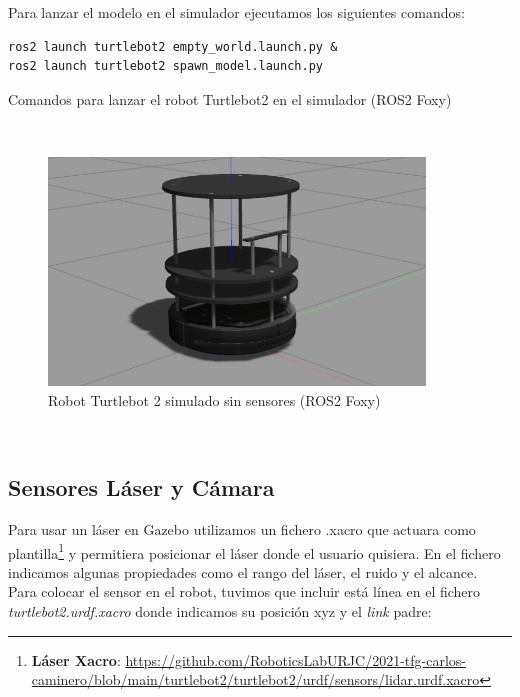 Para lanzar el modelo en el simulador ejecutamos los siguientes comandos:\\
\begin{code}[H]
\begin{lstlisting}
ros2 launch turtlebot2 empty_world.launch.py &
ros2 launch turtlebot2 spawn_model.launch.py
\end{lstlisting}
\caption{Comandos para lanzar el robot Turtlebot2 en el simulador (ROS2 Foxy)}
\label{codd:comandos_turtlebot2_simulador}
\end{code}\

\begin{figure} [H]
  \begin{center}
    \includegraphics[width=10cm]{imagenes/cap4/cuerpo_turtlebot2.png}
  \end{center}
  \caption[Robot Turtlebot 2 simulado sin sensores (ROS2 Foxy)]{Robot Turtlebot 2 simulado sin sensores (ROS2 Foxy)}
  \label{fig:turtlebot2_sin_sensores_simulado}
\end{figure}\



\subsection{Sensores Láser y Cámara}
\label{subsec:sensores_camara}

Para usar un láser en Gazebo utilizamos un fichero .xacro que actuara como plantilla\footnote{\textbf{Láser Xacro}: \url{https://github.com/RoboticsLabURJC/2021-tfg-carlos-caminero/blob/main/turtlebot2/turtlebot2/urdf/sensors/lidar.urdf.xacro}} y permitiera posicionar el láser donde el usuario quisiera. En el fichero indicamos algunas propiedades como el rango del láser, el ruido y el alcance.\\

Para colocar el sensor en el robot, tuvimos que incluir está línea en el fichero \textit{turtlebot2.urdf.xacro} donde indicamos su posición xyz y el \textit{link} padre:\\

